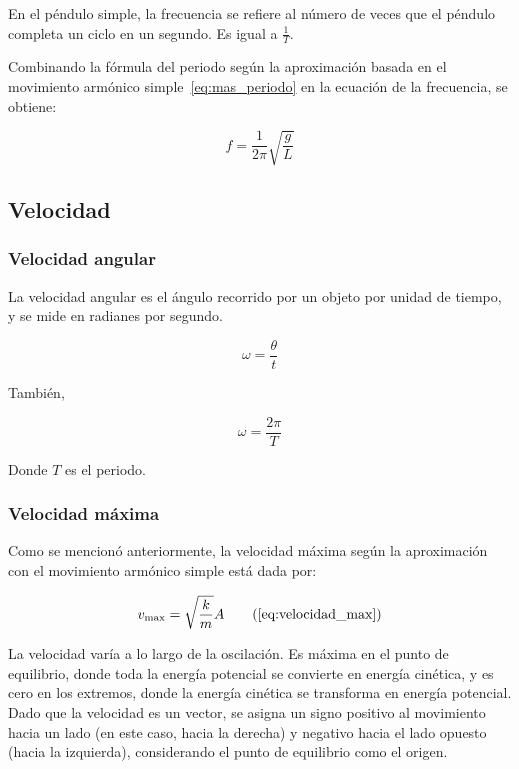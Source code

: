 \documentclass[letterpaper]{report}
\numberwithin{table}{section}
\begin{document}
En el péndulo simple, la frecuencia se refiere al número de veces que el péndulo
completa un ciclo en un segundo. Es igual a $\frac{1}{T}$.

Combinando la fórmula del periodo según la aproximación basada en
el movimiento armónico simple~\eqref{eq:mas_periodo} en la ecuación de la
frecuencia, se obtiene:

\begin{equation}
  f = \frac{1}{2\pi}\sqrt{\frac{g}{L}}
\end{equation}

\subsection{Velocidad}

\subsubsection{Velocidad angular}

La velocidad angular es el ángulo recorrido por un objeto por unidad
de tiempo, y se mide en radianes por segundo.

\begin{equation}
  \omega = \frac{\theta}{t} \label{eq:velocidad_angular}
\end{equation}

También,

\begin{equation}
  \omega = \frac{2\pi}{T}
\end{equation}

Donde $T$ es el periodo.

\subsubsection{Velocidad máxima}

Como se mencionó anteriormente, la velocidad máxima según la
aproximación con el movimiento armónico simple está dada por:

\begin{equation}
  v_{\max} = \sqrt{\frac{k}{m}}A \tag{\ref{eq:velocidad_max}}
\end{equation}

La velocidad varía a lo largo de la oscilación. Es máxima en el punto
de equilibrio, donde toda la energía potencial se convierte en
energía cinética, y es cero en los extremos, donde la energía
cinética se transforma en energía potencial. Dado que la velocidad es
un vector, se asigna un signo positivo al movimiento hacia un lado
(en este caso, hacia la derecha) y negativo hacia el lado opuesto
(hacia la izquierda), considerando el punto de equilibrio como el origen.
\end{document}
